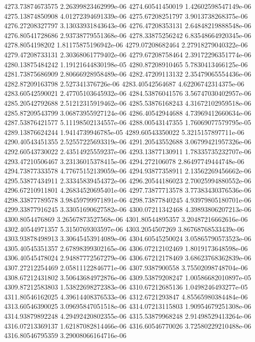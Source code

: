 {4273.73874673575 2.26399823462999e-06
4274.60541450019 1.42602598547149e-06
4275.13874850908 4.01272394691339e-06
4275.67208251797 3.9013738268375e-06
4276.27208327797 3.13033931843643e-06
4276.47208353131 2.64848219888548e-06
4276.80541728686 2.93738779551368e-06
4278.33875256242 6.83548664920345e-06
4278.8054198202 1.81175875196942e-06
4279.07208682464 2.27918279040322e-06
4279.47208733131 2.30368061779402e-06
4279.67208758464 2.39172296351774e-06
4280.13875484242 1.19121644830198e-05
4280.87208910465 5.7830413466125e-06
4281.73875686909 2.80666928958489e-06
4282.47209113132 2.35479065554436e-06
4282.87209163798 2.527341376726e-06
4283.40542564687 4.62206742314375e-06
4283.60542590021 2.47705103645932e-06
4284.53876041576 3.56747030402957e-06
4285.20542792688 2.51212315919462e-06
4285.53876168243 4.31672102959518e-06
4285.87209543799 3.06873955927124e-06
4286.40542944688 4.73969412660634e-06
4287.53876421577 5.11198502134557e-06
4288.00543147355 1.76069077579795e-05
4289.13876624244 1.9414739946785e-05
4289.60543350022 5.3215157897711e-06
4290.40543451355 2.52557225693319e-06
4291.20543552688 3.06799421957326e-06
4292.60543730022 2.43514925559237e-06
4293.13877130911 1.78335735232707e-06
4293.47210506467 3.23136015378415e-06
4294.272106078 2.86497749444748e-06
4294.73877333578 4.77675152139059e-06
4294.93877358911 2.13562269456662e-06
4295.53877434911 2.33345839454372e-06
4296.20544186023 2.70025994880552e-06
4296.67210911801 4.26834520695401e-06
4297.73877713578 3.77383430376536e-06
4298.33877789578 3.98459799971891e-06
4298.73877840245 4.93979805180701e-06
4299.33877916245 3.33051690627582e-06
4300.07211342468 4.39893806207213e-06
4300.8054476869 3.26567873527568e-06
4301.80544895357 3.20487216662616e-06
4302.40544971357 5.3150769303597e-06
4303.2054507269 3.86768768533439e-06
4303.93878498913 3.30645453914089e-06
4304.60545250024 3.05865790573523e-06
4305.40545351357 2.67898399302165e-06
4306.07212102469 1.8019173648598e-06
4306.40545478024 2.94887772567279e-06
4306.67212178469 3.68623768362839e-06
4307.27212254469 2.05811122846771e-06
4307.9387900558 3.75502098748704e-06
4308.67212431802 3.50643684972876e-06
4309.53879208247 1.00586682010897e-05
4309.87212583803 1.53822698272383e-06
4310.67212685136 1.0498246493277e-05
4311.80546162025 4.39614408376533e-06
4312.6721293847 4.85565980384484e-06
4313.60546390025 3.09695847051518e-06
4314.07213115803 1.90954679251308e-06
4314.93879892248 4.29492420802355e-06
4315.53879968248 2.91498529413264e-06
4316.07213369137 1.62187082814466e-06
4316.60546770026 3.72580229210488e-06
4316.80546795359 3.29008066164716e-06
}
